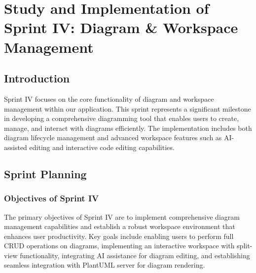 \chapter[Sprint IV]{Study and Implementation of Sprint IV: Diagram \& Workspace Management}

\minitoc

\section{Introduction}
Sprint IV focuses on the core functionality of diagram and workspace management within our application. This sprint represents a significant milestone in developing a comprehensive diagramming tool that enables users to create, manage, and interact with diagrams efficiently. The implementation includes both diagram lifecycle management and advanced workspace features such as AI-assisted editing and interactive code editing capabilities.

\section{Sprint Planning}

\subsection{Objectives of Sprint IV}
The primary objectives of Sprint IV are to implement comprehensive diagram management capabilities and establish a robust workspace environment that enhances user productivity. Key goals include enabling users to perform full CRUD operations on diagrams, implementing an interactive workspace with split-view functionality, integrating AI assistance for diagram editing, and establishing seamless integration with PlantUML server for diagram rendering.

